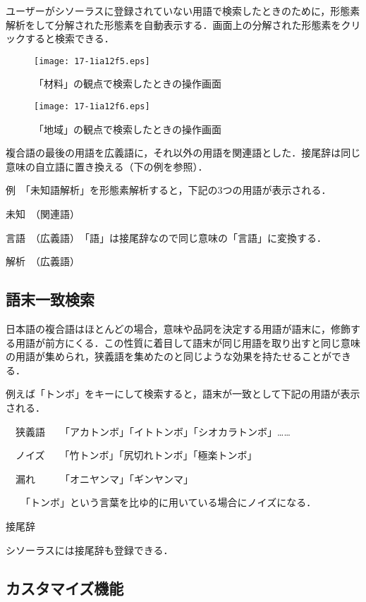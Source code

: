 \documentclass[japanese]{jnlp_1.4}
\begin{document}
ユーザーがシソーラスに登録されていない用語で検索したときのために，形態素解析をして分解された形態素を自動表示する．画面上の分解された形態素をクリックすると検索できる．

\begin{figure}[t]
 \begin{center}
  \texttt{[image: 17-1ia12f5.eps]}
 \end{center}
 \caption{「材料」の観点で検索したときの操作画面}
 \label{fig:5}
\end{figure}
\begin{figure}[t]
 \begin{center}
  \texttt{[image: 17-1ia12f6.eps]}
 \end{center}
 \caption{「地域」の観点で検索したときの操作画面}
 \label{fig:6}
\end{figure}

複合語の最後の用語を広義語に，それ以外の用語を関連語とした．接尾辞は同じ意味の自立語に置き換える（下の例を参照）．

例　「未知語解析」を形態素解析すると，下記の3つの用語が表示される．

未知　（関連語）

言語　（広義語）　「語」は接尾辞なので同じ意味の「言語」に変換する．

解析　（広義語）


\subsection{語末一致検索}

日本語の複合語はほとんどの場合，意味や品詞を決定する用語が語末に，修飾する用語が前方にくる．この性質に着目して語末が同じ用語を取り出すと同じ意味の用語が集められ，狭義語を集めたのと同じような効果を持たせることができる．

例えば「トンボ」をキーにして検索すると，語末が一致として下記の用語が表示される．

　狭義語　　「アカトンボ」「イトトンボ」「シオカラトンボ」……

　ノイズ　　「竹トンボ」「尻切れトンボ」「極楽トンボ」

　漏れ　　　「オニヤンマ」「ギンヤンマ」

　　「トンボ」という言葉を比ゆ的に用いている場合にノイズになる．

接尾辞

シソーラスには接尾辞も登録できる．


\subsection{カスタマイズ機能}
\end{document}
